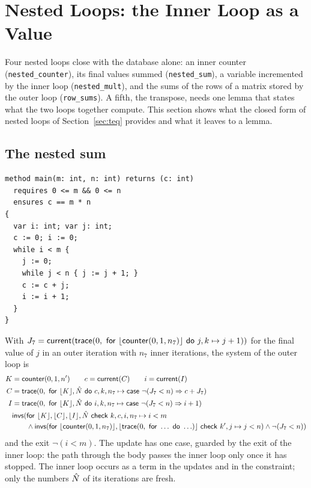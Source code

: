 \section{Nested Loops: the Inner Loop as a Value}\label{sec:nested}

Four nested loops close with the database alone: an inner counter (\texttt{nested\_counter}), its final values
summed (\texttt{nested\_sum}), a variable incremented by the inner loop (\texttt{nested\_mult}), and the sums of
the rows of a matrix stored by the outer loop (\texttt{row\_sums}). A fifth, the transpose, needs one lemma
that states what the two loops together compute. This section shows what the closed form of nested loops of
Section~\ref{sec:teq} provides and what it leaves to a lemma.

\subsection{The nested sum}
\begin{lstlisting}
method main(m: int, n: int) returns (c: int)
  requires 0 <= m && 0 <= n
  ensures c == m * n
{
  var i: int; var j: int;
  c := 0; i := 0;
  while i < m {
    j := 0;
    while j < n { j := j + 1; }
    c := c + j;
    i := i + 1;
  }
}
\end{lstlisting}
With $J_7 = \mathsf{current}(\mathsf{trace}(0,\ \mathsf{for}\ \lfloor \mathsf{counter}(0, 1, n_7)\rfloor\ \mathsf{do}\ j, k \mapsto j + 1))$ for the final value of $j$ in an outer
iteration with $n_7$ inner iterations, the system of the outer loop is
\begin{align}
  K &= \cnt(0, 1, n') \qquad c = \cur(C) \qquad i = \cur(I) \nonumber\\
  C &= \tr{0}{\bl{K}, \seq{N}}{c, k, n_7 \mapsto \upd{\neg(J_7 < n)}{c + J_7}} \label{eq:ns1}\\
  I &= \tr{0}{\bl{K}, \seq{N}}{i, k, n_7 \mapsto \upd{\neg(J_7 < n)}{i + 1}} \nonumber\\
  &\mathsf{invs}(\mathsf{for}\ \bl{K}, \bl{C}, \bl{I}, \seq{N}\ \mathsf{check}\ k, c, i, n_7 \mapsto i < m \nonumber\\
  &\qquad \wedge \al{\bl{\cnt(0, 1, n_7)}, \bl{\tr{0}{\ldots}{\ldots}}}{k', j \mapsto j < n} \wedge \neg(J_7 < n)) \label{eq:ns2}
\end{align}
and the exit $\neg(i < m)$. The update has one case, guarded by the exit of the inner loop: the path through the
body passes the inner loop only once it has stopped. The inner loop occurs as a term in the updates and in the
constraint; only the numbers $\hat{N}$ of its iterations are fresh.

